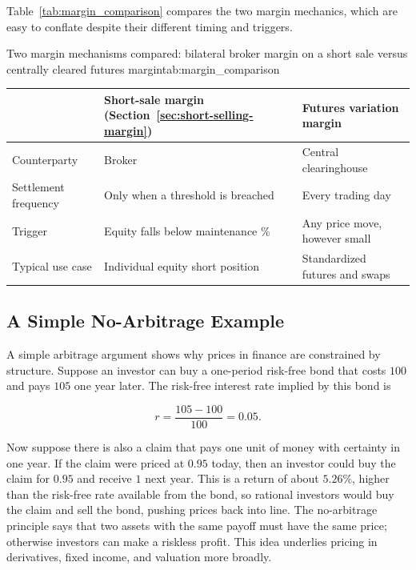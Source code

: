 \documentclass[../ai_in_finance]{subfiles}
\begin{document}
Table~\ref{tab:margin_comparison} compares the two margin mechanics, which are easy to conflate despite their different timing and triggers.

\begin{booktable}[htbp]{Two margin mechanisms compared: bilateral broker margin on a short sale versus centrally cleared futures margin}{tab:margin_comparison}
\begin{tabular}{lll}
\toprule
& Short-sale margin (Section~\ref{sec:short-selling-margin}) & Futures variation margin \\
\midrule
Counterparty & Broker & Central clearinghouse \\
Settlement frequency & Only when a threshold is breached & Every trading day \\
Trigger & Equity falls below maintenance \% & Any price move, however small \\
Typical use case & Individual equity short position & Standardized futures and swaps \\
\bottomrule
\end{tabular}
\end{booktable}

\subsection{A Simple No-Arbitrage Example}
\label{sec:no-arbitrage}

A simple arbitrage argument shows why prices in finance are constrained by structure. Suppose an investor can buy a one-period risk-free bond that costs $100$ and pays $105$ one year later. The risk-free interest rate implied by this bond is

\begin{equation*}
r = \frac{105 - 100}{100} = 0.05.
\end{equation*}

Now suppose there is also a claim that pays one unit of money with certainty in one year. If the claim were priced at $0.95$ today, then an investor could buy the claim for $0.95$ and receive $1$ next year. This is a return of about $5.26\%$, higher than the risk-free rate available from the bond, so rational investors would buy the claim and sell the bond, pushing prices back into line. The no-arbitrage principle says that two assets with the same payoff must have the same price; otherwise investors can make a riskless profit. This idea underlies pricing in derivatives, fixed income, and valuation more broadly.
\end{document}
